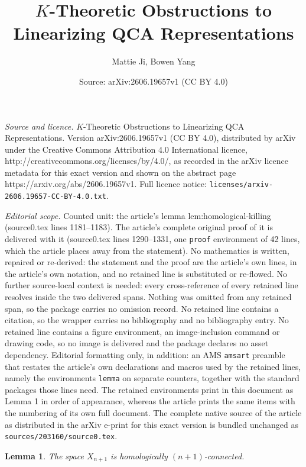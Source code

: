 \documentclass[10pt,a4paper]{amsart}
\title{$K$-Theoretic Obstructions to Linearizing QCA Representations}
\author{Mattie Ji, Bowen Yang}
\date{Source: arXiv:2606.19657v1 (CC BY 4.0)}
\newtheorem{lemma}{Lemma}
\begin{document}
\maketitle

\noindent\emph{Source and licence.} $K$-Theoretic Obstructions to Linearizing QCA Representations. Version arXiv:2606.19657v1 (CC BY 4.0), distributed by arXiv under the Creative Commons Attribution 4.0 International licence, http://creativecommons.org/licenses/by/4.0/, as recorded in the arXiv licence metadata for this exact version and shown on the abstract page https://arxiv.org/abs/2606.19657v1. Full licence notice: \texttt{licenses/arxiv-2606.19657-CC-BY-4.0.txt}.\par\smallskip

\noindent\textit{Editorial scope.} Counted unit: the article's lemma lem:homological-killing (source0.tex lines 1181--1183). The article's complete original proof of it is delivered with it (source0.tex lines 1290--1331, one \texttt{proof} environment of 42 lines, which the article places away from the statement). No mathematics is written, repaired or re-derived: the statement and the proof are the article's own lines, in the article's own notation, and no retained line is substituted or re-flowed.  No further source-local context is needed: every cross-reference of every retained line resolves inside the two delivered spans.  Nothing was omitted from any retained span, so the package carries no omission record.  No retained line contains a citation, so the wrapper carries no bibliography and no bibliography entry.  No retained line contains a figure environment, an image-inclusion command or drawing code, so no image is delivered and the package declares no asset dependency.  Editorial formatting only, in addition: an AMS \texttt{amsart} preamble that restates the article's own declarations and macros used by the retained lines, namely the environments \texttt{lemma} on separate counters, together with the standard packages those lines need.  The retained environments print in this document as Lemma 1 in order of appearance, whereas the article prints the same items with the numbering of its own full document.  The complete native source of the article as distributed in the arXiv e-print for this exact version is bundled unchanged as \texttt{sources/203160/source0.tex}.
\begin{lemma} \label{lem:homological-killing}
The space $X_{n+1}$ is homologically $(n+1)$-connected.
\end{lemma}
\end{document}
